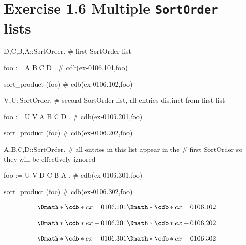 \documentclass[12pt]{cdblatex}
\begin{document}
\section*{Exercise 1.6 Multiple {\tt SortOrder} lists}

\begin{cadabra}
   {D,C,B,A}::SortOrder.  # first SortOrder list

   foo := A B C D .       # cdb(ex-0106.101,foo)

   sort_product (foo)     # cdb(ex-0106.102,foo)

   {V,U}::SortOrder.      # second SortOrder list, all entries distinct from first list

   foo := U V A B C D .   # cdb(ex-0106.201,foo)

   sort_product (foo)     # cdb(ex-0106.202,foo)

   {A,B,C,D}::SortOrder.  # all entries in this list appear in the
                          # first SortOrder so they will be effectively ignored

   foo := U V D C B A .   # cdb(ex-0106.301,foo)

   sort_product (foo)     # cdb(ex-0106.302,foo)
\end{cadabra}


\begin{dgroup*}[spread=2pt]
   \Dmath*{\cdb*{ex-0106.101}}
   \Dmath*{\cdb*{ex-0106.102}}
\end{dgroup*}

\begin{dgroup*}[spread=2pt]
   \Dmath*{\cdb*{ex-0106.201}}
   \Dmath*{\cdb*{ex-0106.202}}
\end{dgroup*}

\begin{dgroup*}[spread=2pt]
   \Dmath*{\cdb*{ex-0106.301}}
   \Dmath*{\cdb*{ex-0106.302}}
\end{dgroup*}
\end{document}
